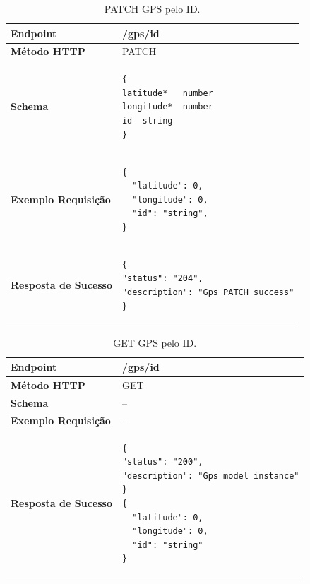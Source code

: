 \begin{apendicesenv}

\begin{table}[H]
\begin{tabular}{|l|l|}
\hline
\textbf{Endpoint}            & /gps/{id} \\ \hline
\textbf{Método HTTP}         & PATCH \\ \hline
\textbf{Schema}              &  
\begin{lstlisting}
{
latitude*	number
longitude*	number
id	string
}
\end{lstlisting}\\ \hline
\textbf{Exemplo Requisição}  &  
\begin{lstlisting}
{
  "latitude": 0,
  "longitude": 0,
  "id": "string",
}
\end{lstlisting} \\ \hline
\textbf{Resposta de Sucesso} &
\begin{lstlisting}
{
"status": "204",
"description": "Gps PATCH success"
}
\end{lstlisting}
\\ \hline
\end{tabular}
\caption{PATCH GPS pelo ID.}
\label{patch_gps_id}
\end{table}


\begin{table}[H]
\begin{tabular}{|l|l|}
\hline
\textbf{Endpoint}            & /gps/{id} \\ \hline
\textbf{Método HTTP}         & GET \\ \hline
\textbf{Schema}              & -- \\ \hline
\textbf{Exemplo Requisição}  & -- \\ \hline
\textbf{Resposta de Sucesso} &
\begin{lstlisting}
{
"status": "200",
"description": "Gps model instance"
}
{
  "latitude": 0,
  "longitude": 0,
  "id": "string"
}
\end{lstlisting}
\\ \hline
\end{tabular}
\caption{GET GPS pelo ID.}
\label{get_gps_id}
\end{table}



\end{apendicesenv}
